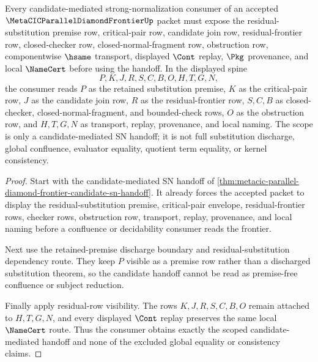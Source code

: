 \begin{theorem}
\label{thm:metacic-parallel-diamond-frontier-candidate-sn-handoff-scope}
Every candidate-mediated strong-normalization consumer of an accepted $\MetaCICParallelDiamondFrontierUp$ packet must expose the residual-substitution premise row, critical-pair row, candidate join row, residual-frontier row, closed-checker row, closed-normal-fragment row, obstruction row, componentwise $\hsame$ transport, displayed $\Cont$ replay, $\Pkg$ provenance, and local $\NameCert$ before using the handoff. In the displayed spine
$$
P,K,J,R,S,C,B,O,H,T,G,N ,
$$
the consumer reads $P$ as the retained substitution premise, $K$ as the critical-pair row, $J$ as the candidate join row, $R$ as the residual-frontier row, $S,C,B$ as closed-checker, closed-normal-fragment, and bounded-check rows, $O$ as the obstruction row, and $H,T,G,N$ as transport, replay, provenance, and local naming. The scope is only a candidate-mediated SN handoff; it is not full substitution discharge, global confluence, evaluator equality, quotient term equality, or kernel consistency.
\end{theorem}
\begin{proof}
Start with the candidate-mediated SN handoff of \autoref{thm:metacic-parallel-diamond-frontier-candidate-sn-handoff}. It already forces the accepted packet to display the residual-substitution premise, critical-pair envelope, residual-frontier rows, checker rows, obstruction row, transport, replay, provenance, and local naming before a confluence or decidability consumer reads the frontier.

Next use the retained-premise discharge boundary and residual-substitution dependency route. They keep $P$ visible as a premise row rather than a discharged substitution theorem, so the candidate handoff cannot be read as premise-free confluence or subject reduction.

Finally apply residual-row visibility. The rows $K,J,R,S,C,B,O$ remain attached to $H,T,G,N$, and every displayed $\Cont$ replay preserves the same local $\NameCert$ route. Thus the consumer obtains exactly the scoped candidate-mediated handoff and none of the excluded global equality or consistency claims.
\end{proof}

